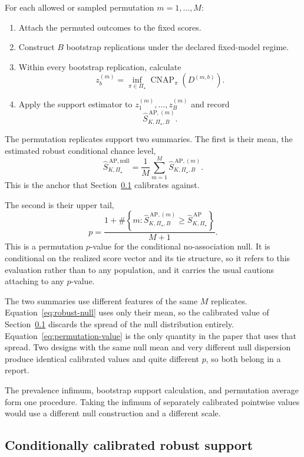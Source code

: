 \documentclass[11pt]{article}
\newcommand{\CNAP}{\operatorname{CNAP}}
\newcommand{\PSet}{\Pi_\star}
\newcommand{\SRobHat}{\widehat S_{K,\PSet}^{\,\mathrm{AP}}}
\newcommand{\SRobNullHat}{\widehat S_{K,\PSet}^{\,\mathrm{AP,null}}}
\theoremstyle{remark}
\begin{document}
For each allowed or sampled permutation $m=1,\ldots,M$:
\begin{enumerate}
\item Attach the permuted outcomes to the fixed scores.
\item Construct $B$ bootstrap replications under the declared fixed-model regime.
\item Within every bootstrap replication, calculate
\[
z_b^{(m)}
=
\inf_{\pi\in\PSet}
\CNAP_\pi(D^{(m,b)}).
\]
\item Apply the support estimator to $z_1^{(m)},\ldots,z_B^{(m)}$ and record
\[
\widehat S_{K,\PSet,B}^{\,\mathrm{AP},(m)}.
\]
\end{enumerate}

The permutation replicates support two summaries. The first is their mean, the estimated robust conditional chance level,
\begin{equation}
\SRobNullHat
=
\frac{1}{M}
\sum_{m=1}^{M}
\widehat S_{K,\PSet,B}^{\,\mathrm{AP},(m)}.
\label{eq:robust-null}
\end{equation}
This is the anchor that Section~\ref{sec:calibration-def} calibrates against.

The second is their upper tail,
\begin{equation}
p
=
\frac{
1+
\#\left\{
m:
\widehat S_{K,\PSet,B}^{\,\mathrm{AP},(m)}
\geq
\SRobHat
\right\}
}{M+1}.
\label{eq:permutation-value}
\end{equation}
This is a permutation $p$-value for the conditional no-association null. It is conditional on the realized score vector and its tie structure, so it refers to this evaluation rather than to any population, and it carries the usual cautions attaching to any $p$-value.

The two summaries use different features of the same $M$ replicates. Equation~\eqref{eq:robust-null} uses only their mean, so the calibrated value of Section~\ref{sec:calibration-def} discards the spread of the null distribution entirely. Equation~\eqref{eq:permutation-value} is the only quantity in the paper that uses that spread. Two designs with the same null mean and very different null dispersion produce identical calibrated values and quite different $p$, so both belong in a report.

The prevalence infimum, bootstrap support calculation, and permutation average form one procedure. Taking the infimum of separately calibrated pointwise values would use a different null construction and a different scale.

\subsection{Conditionally calibrated robust support}
\label{sec:calibration-def}
\end{document}
